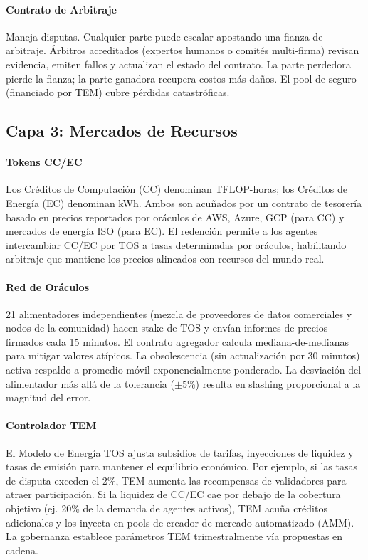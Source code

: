 \documentclass[11pt]{article}
\begin{document}
\paragraph{Contrato de Arbitraje} Maneja disputas. Cualquier parte puede escalar apostando una fianza de arbitraje. Árbitros acreditados (expertos humanos o comités multi-firma) revisan evidencia, emiten fallos y actualizan el estado del contrato. La parte perdedora pierde la fianza; la parte ganadora recupera costos más daños. El pool de seguro (financiado por TEM) cubre pérdidas catastróficas.

\subsection{Capa 3: Mercados de Recursos}
\paragraph{Tokens CC/EC} Los Créditos de Computación (CC) denominan TFLOP-horas; los Créditos de Energía (EC) denominan kWh. Ambos son acuñados por un contrato de tesorería basado en precios reportados por oráculos de AWS, Azure, GCP (para CC) y mercados de energía ISO (para EC). El redención permite a los agentes intercambiar CC/EC por TOS a tasas determinadas por oráculos, habilitando arbitraje que mantiene los precios alineados con recursos del mundo real.

\paragraph{Red de Oráculos} 21 alimentadores independientes (mezcla de proveedores de datos comerciales y nodos de la comunidad) hacen stake de TOS y envían informes de precios firmados cada 15 minutos. El contrato agregador calcula mediana-de-medianas para mitigar valores atípicos. La obsolescencia (sin actualización por 30 minutos) activa respaldo a promedio móvil exponencialmente ponderado. La desviación del alimentador más allá de la tolerancia ($\pm$5\%) resulta en slashing proporcional a la magnitud del error.

\paragraph{Controlador TEM} El Modelo de Energía TOS ajusta subsidios de tarifas, inyecciones de liquidez y tasas de emisión para mantener el equilibrio económico. Por ejemplo, si las tasas de disputa exceden el 2\%, TEM aumenta las recompensas de validadores para atraer participación. Si la liquidez de CC/EC cae por debajo de la cobertura objetivo (ej. 20\% de la demanda de agentes activos), TEM acuña créditos adicionales y los inyecta en pools de creador de mercado automatizado (AMM). La gobernanza establece parámetros TEM trimestralmente vía propuestas en cadena.
\end{document}
